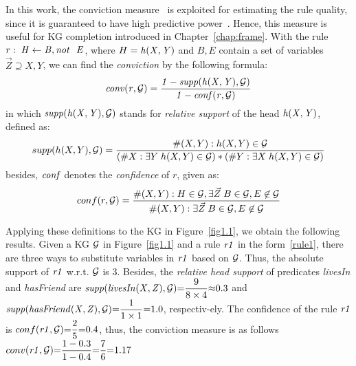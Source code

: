In this work, the conviction measure~\cite{ref48} is exploited for estimating the rule quality, since it is guaranteed to have high predictive power~\cite{ref46}. Hence, this measure is useful for KG completion introduced in Chapter~\ref{chap:frame}. With the rule $r:\;\mi{H\leftarrow B, \naf\ E}$, where $H=\mathit{h(X,Y)}$ and $B,E$ contain a set of variables $\vec{Z}\supseteq X,Y$, we can find the \emph{conviction} by the following formula:
\vspace{-.26cm}
\begin{equation}
\mathit{conv(r, \mathcal{G})= \dfrac{1 - supp(h(X,Y), \mathcal{G})}{1 - conf(r, \mathcal{G})}}
\end{equation}
in which $\mathit{supp(h(X,Y),\mathcal{G})}$ stands for \textit{relative support} of the head $\mathit{h(X,Y)}$, defined as:
\vspace{-.28cm}
\begin{equation}
supp(h(X,Y),\mathcal{G})=\dfrac{\#(X,Y):h(X,Y)\in \mathcal{G}}{(\#X:\exists Y\;h(X,Y)\in \mathcal{G})*(\#Y:\exists X\;h(X,Y)\in \mathcal{G})}
\end{equation}
besides, $\mathit{conf}$ denotes the \textit{confidence} of $r$, given as:
\begin{equation}
conf(r,\mathcal{G})=\dfrac{\#(X,Y): H \in \mathcal{G}, \exists \vec{Z}\;B\in \mathcal{G},E \not \in \mathcal{G}}{\#(X,Y):\exists \vec{Z}\; B\in \mathcal{G}, E \not \in \mathcal{G}}
\end{equation}
\vspace{-.3cm}

\begin{example}
Applying these definitions to the KG in Figure~\ref{fig1.1}, we obtain the following results. Given a KG $\mathcal{G}$ in Figure~\ref{fig1.1} and a rule $\mathit{r1}$ in the form~\ref{rule1}, there are three ways to substitute variables in $\mathit{r1}$ based on $\mathcal{G}$. Thus, the absolute support of $\mathit{r1}$ w.r.t. $\mathcal{G}$ is $3$. Besides, the \textit{relative head support} of predicates \textit{livesIn} and \textit{hasFriend} are $\mathit{supp(livesIn(X,Z), \mathcal{G})}{=}\dfrac{9}{8 \times 4}{\approx} 0.3$ and  $\mathit{supp(hasFriend(X,Z), \mathcal{G})}{=}\dfrac{1}{1 \times 1}{=} 1.0$, respectiv-ely. The confidence of the rule $\mathit{r1}$ is $conf(\mathit{r1}, \mathcal{G}) {=} \dfrac{2}{5} {=} 0.4$, thus, the conviction measure is as follows $conv(\mathit{r1}, \mathcal{G}) {=} \dfrac{1-0.3}{1 - 0.4} {=} \dfrac{7}{6} {=} 1.17$
\end{example}